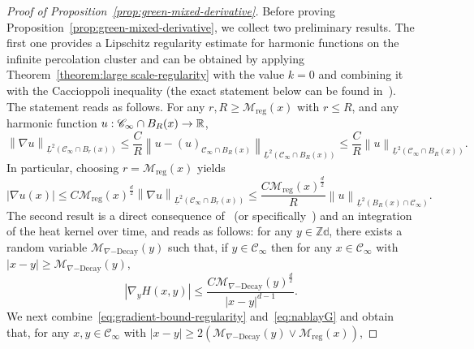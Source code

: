 \documentclass[12pt]{amsart}
\numberwithin{equation}{section}
\begin{document}
	
	\begin{proof}[Proof of Proposition~\ref{prop:green-mixed-derivative}]
		Before proving Proposition~\ref{prop:green-mixed-derivative}, we collect two preliminary results. The first one provides a Lipschitz regularity estimate for harmonic functions on the infinite percolation cluster and can be obtained by applying Theorem~\ref{theorem:large scale-regularity} with the value $k=0$ and combining it with the Caccioppoli inequality (the exact statement below can be found in~\cite[Proposition 2.14]{dario-corrector}). The statement reads as follows. For any $r , R \geq \mathcal{M}_{\mathrm{reg}}(x)$ with $r \leq R$, and any harmonic function $u : \mathscr{C}_\infty \cap B_R(x) \to \operatorname{\mathbb{R}}$,
		\begin{equation*}
			\left\| \nabla u \right\|_{\underline{L}^2(\mathscr{C}_\infty \cap B_r(x))} \leq \frac{C}{R} \left\|  u - (u)_{\mathscr{C}_\infty \cap B_R(x)} \right\|_{\underline{L}^2(\mathscr{C}_\infty \cap B_R(x))} \leq \frac{C}{R} \left\|  u \right\|_{\underline{L}^2(\mathscr{C}_\infty \cap B_R(x))}.
		\end{equation*}
		In particular, choosing $r = \mathcal{M}_{\mathrm{reg}}(x)$ yields
		\begin{equation} \label{eq:gradient-bound-regularity}
			| \nabla u(x) | \leq C \mathcal{M}_{\mathrm{reg}}(x)^{\frac{d}{2}} \left\| \nabla u \right\|_{\underline{L}^2(\mathscr{C}_\infty \cap B_r(x))}  \leq  \frac{C \mathcal{M}_{\mathrm{reg}}(x)^{\frac{d}{2}}}{R} \left\| u \right\|_{\underline{L}^2(B_R(x) \cap \mathscr{C}_{\infty})}.
		\end{equation}
		The second result is a direct consequence of~\cite[Theorem 3]{dario-gu-green} (or specifically~\cite[Remark 1.3]{dario-gu-green}) and an integration of the heat kernel over time, and reads as follows: for any $y \in \mathbb{Zd}$, there exists a random variable $\mathcal{M}_{\nabla\mathrm{-Decay}}(y)$ such that, if $y \in \mathscr{C}_\infty$ then for any $x \in \mathscr{C}_\infty$ with $|x - y| \geq \mathcal{M}_{\nabla\mathrm{-Decay}}(y)$,
		\begin{equation} \label{eq:nablayG}
			\left| \nabla_y H(x , y) \right| \leq \frac{C \mathcal{M}_{\nabla\mathrm{-Decay}}(y)^{\frac{d}{2}}}{|x - y|^{d-1}}.
		\end{equation}
		We next combine~\eqref{eq:gradient-bound-regularity} and~\eqref{eq:nablayG} and obtain that, for any $x , y \in \mathscr{C}_\infty$ with $|x - y| \geq 2 \left( \mathcal{M}_{\nabla\mathrm{-Decay}}(y) \vee \mathcal{M}_{\mathrm{reg}}(x) \right)$,

\end{proof}
\end{document}

